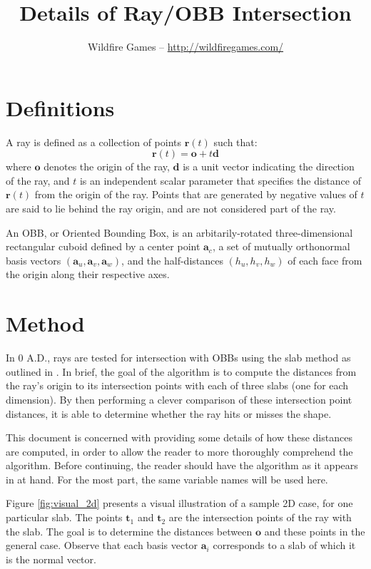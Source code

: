 \documentclass[a4paper,10pt]{article}
\title{Details of Ray/OBB Intersection}
\author{Wildfire Games -- \url{http://wildfiregames.com/}}
\begin{document}
\maketitle

\section{Definitions}
A ray is defined as a collection of points $\mathbf{r}(t)$ such that:
\begin{equation*}
\mathbf{r}(t) = \mathbf{o} + t \mathbf{d}
\end{equation*}
where $\mathbf{o}$ denotes the origin of the ray, $\mathbf{d}$ is a unit vector indicating the direction of the ray, and $t$ is an independent scalar parameter that specifies the distance of $\mathbf{r}(t)$ from the origin of the ray. Points that are generated by negative values of $t$ are said to lie behind the ray origin, and are not considered part of the ray.

An OBB, or Oriented Bounding Box, is an arbitarily-rotated three-dimensional rectangular cuboid defined by a center point $\mathbf{a}_c$, a set of mutually orthonormal basis vectors $(\mathbf{a}_u, \mathbf{a}_v, \mathbf{a}_w)$, and the half-distances $(h_u, h_v, h_w)$ of each face from the origin along their respective axes.

\section{Method}
In 0 A.D., rays are tested for intersection with OBBs using the slab method as outlined in \cite{real_time_rendering_3}. In brief, the goal of the algorithm is to compute the distances from the ray's origin to its intersection points with each of three slabs (one for each dimension). By then performing a clever comparison of these intersection point distances, it is able to determine whether the ray hits or misses the shape.

This document is concerned with providing some details of how these distances are computed, in order to allow the reader to more thoroughly comprehend the algorithm. Before continuing, the reader should have the algorithm as it appears in \cite{real_time_rendering_3} at hand. For the most part, the same variable names will be used here.

Figure \ref{fig:visual_2d} presents a visual illustration of a sample 2D case, for one particular slab. The points $\mathbf{t}_1$ and $\mathbf{t}_2$ are the intersection points of the ray with the slab. The goal is to determine the distances between $\mathbf{o}$ and these points in the general case. Observe that each basis vector $\mathbf{a}_i$ corresponds to a slab of which it is the normal vector.
\end{document}
